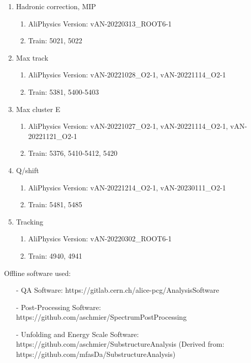 \begin{enumerate}
    \item Hadronic correction, MIP
    \begin{enumerate}
        \item AliPhysics Version: vAN-20220313\_ROOT6-1
        \item Train: 5021, 5022
    \end{enumerate}
    \item Max track \pT
    \begin{enumerate}
        \item AliPhysics Version: vAN-20221028\_O2-1, vAN-20221114\_O2-1
        \item Train: 5381, 5400-5403
    \end{enumerate}
    \item Max cluster E
    \begin{enumerate}
        \item AliPhysics Version: vAN-20221027\_O2-1, vAN-20221114\_O2-1, vAN-20221121\_O2-1
        \item Train: 5376, 5410-5412, 5420
    \end{enumerate}
    \item Q/\pT shift
    \begin{enumerate}
        \item AliPhysics Version: vAN-20221214\_O2-1, vAN-20230111\_O2-1 
        \item Train: 5481, 5485
    \end{enumerate}
    \item Tracking
    \begin{enumerate}
        \item AliPhysics Version: vAN-20220302\_ROOT6-1
        \item Train: 4940, 4941
    \end{enumerate}
\end{enumerate}

Offline software used:
\begin{enumerate}
    \item[-] QA Software: https://gitlab.cern.ch/alice-pcg/AnalysisSoftware
    \item[-] Post-Processing Software: https://github.com/aschmier/SpectrumPostProcessing
    \item[-] Unfolding and Energy Scale Software: https://github.com/aschmier/SubstructureAnalysis (Derived from: https://github.com/mfasDa/SubstructureAnalysis)
\end{enumerate}

\newpage

